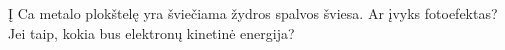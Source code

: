 \question Į Ca metalo plokštelę yra šviečiama žydros spalvos šviesa. Ar įvyks fotoefektas? Jei taip, kokia bus elektronų kinetinė energija?